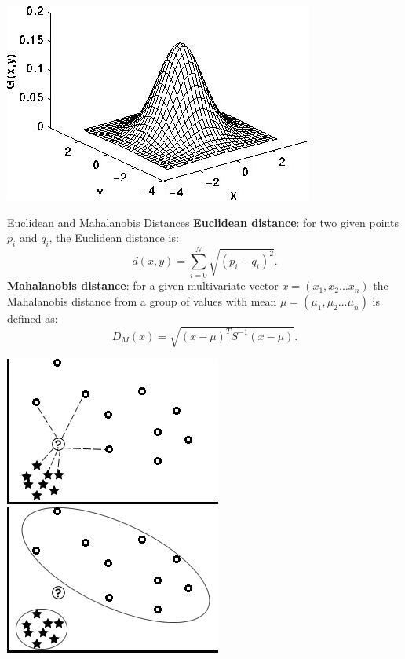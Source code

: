 \documentclass[xcolor=dvipsnames]{beamer}
\begin{document}
\begin{frame}
\begin{center}
\includegraphics[width=\textwidth]{imgs/gauss.jpg}
\end{center}
\end{frame}

\begin{frame}[label=math-distance]{Euclidean and Mahalanobis Distances}
 \textbf{Euclidean distance}: for two given points $p_i$ and $q_i$, the Euclidean distance is:
  \begin{equation} \label{eq:euclidean}
   d(x,y) = \sum_{i=0}^{N} \sqrt{(p_i-q_i)^2}.
  \end{equation}
 \textbf{Mahalanobis distance}: for a given multivariate vector $x = (x_1, x_2 \ldots x_n)$ the Mahalanobis distance from a group of values with mean $\mu = (\mu_1, \mu_2 \ldots \mu_n)$ is defined as:
  \begin{equation} \label{eq:mahalanobis}
   D_M(x) = \sqrt{(x-\mu)^TS^{-1}(x-\mu)}.
  \end{equation}
\end{frame}

\begin{frame}
\begin{center}
 \includegraphics[width=.5\textwidth]{imgs/ex_euc_dist-fw.png}
 \includegraphics[width=.5\textwidth]{imgs/ex_mah_dist-fw.png}
\end{center}
\end{frame}
\end{document}
